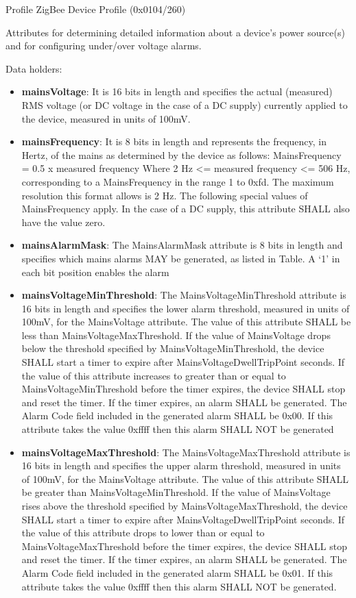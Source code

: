 Profile ZigBee Device Profile (0x0104/260)

Attributes for determining detailed information about a device’s power source(s) and for configuring under/over voltage alarms.
\newline

\noindent
Data holders:

\begin{itemize}
\item \textbf{mainsVoltage}: It  is 16 bits in length and specifies the actual (measured) RMS voltage (or DC voltage in the case of a DC supply) currently applied to the device, measured in units of 100mV.
\item \textbf{mainsFrequency}: It  is 8 bits in length and represents the frequency, in Hertz, of the mains as determined by the device as follows: MainsFrequency = 0.5 x measured frequency Where 2 Hz <= measured frequency <= 506 Hz, corresponding to a MainsFrequency in the range 1 to 0xfd. The maximum resolution this format allows is 2 Hz. The following special values of MainsFrequency apply. In the case of a DC supply, this attribute SHALL also have the value zero.
\item \textbf{mainsAlarmMask}: The MainsAlarmMask attribute is 8 bits in length and specifies which mains alarms MAY be generated, as listed in Table. A ‘1’ in each bit position enables the alarm
\item \textbf{mainsVoltageMinThreshold}: The MainsVoltageMinThreshold attribute is 16 bits in length and specifies the lower alarm threshold, measured in units of 100mV, for the MainsVoltage attribute. The value of this attribute SHALL be less than MainsVoltageMaxThreshold. If the value of MainsVoltage drops below the threshold specified by MainsVoltageMinThreshold, the device SHALL start a timer to expire after MainsVoltageDwellTripPoint seconds. If the value of this attribute increases to greater than or equal to MainsVoltageMinThreshold before the timer expires, the device SHALL stop and reset the timer. If the timer expires, an alarm SHALL be generated. The Alarm Code field included in the generated alarm SHALL be 0x00. If this attribute takes the value 0xffff then this alarm SHALL NOT be generated
\item \textbf{mainsVoltageMaxThreshold}: The MainsVoltageMaxThreshold attribute is 16 bits in length and specifies the upper alarm threshold, measured in units of 100mV, for the MainsVoltage attribute. The value of this attribute SHALL be greater than MainsVoltageMinThreshold. If the value of MainsVoltage rises above the threshold specified by MainsVoltageMaxThreshold, the device SHALL start a timer to expire after MainsVoltageDwellTripPoint seconds. If the value of this attribute drops to lower than or equal to MainsVoltageMaxThreshold before the timer expires, the device SHALL stop and reset the timer. If the timer expires, an alarm SHALL be generated. The Alarm Code field included in the generated alarm SHALL be 0x01. If this attribute takes the value 0xffff then this alarm SHALL NOT be generated.

\end{itemize}
